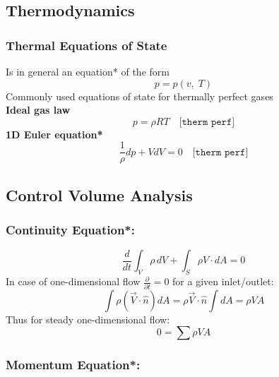 \subsection*{Thermodynamics}

\subsubsection*{Thermal Equations of State}
	Is in general an equation* of the form
	\begin{equation*}
		p=p(v,\;T)
	\end{equation*}
	Commonly used equations of state for thermally perfect gases\\
	\textbf{Ideal gas law}
	\begin{equation*}
		p = \rho RT \quad \texttt{[therm perf]}
	\end{equation*}
	\textbf{1D Euler equation*}
	\begin{equation*}
		\frac{1}{\rho} dp + V dV = 0 \quad \texttt{[therm perf]}
	\end{equation*}

\subsection*{Control Volume Analysis}

\subsubsection*{Continuity Equation*:}

	\begin{equation*}
		\frac{d}{dt} \int_V \rho \, dV + \int_S \rho V \cdot dA = 0
	\end{equation*}
	In case of one-dimensional flow $\frac{\partial}{\partial t} = 0$ for a given inlet/outlet:
	\begin{equation*}
		\int \rho (\vec{V} \cdot \hat{n} )d A = \rho\vec{V}\cdot \hat{n} \int d A = \rho V A
	\end{equation*}
	\noindent
	Thus for steady one-dimensional flow:
	\begin{equation*}
		0 = \sum \rho V A
	\end{equation*}

\subsubsection*{Momentum Equation*:}


